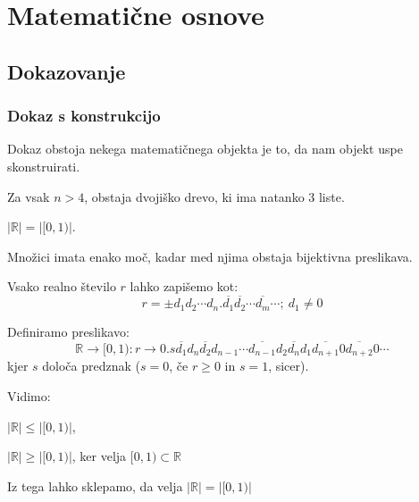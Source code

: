 \documentclass[10pt,a4paper,oneside]{book}
\begin{document}
\section{Matematične osnove}
\subsection{Dokazovanje}
\subsubsection{Dokaz s konstrukcijo}
Dokaz obstoja nekega matematičnega objekta je to, da nam objekt uspe skonstruirati.

\begin{primeri}
\item Za vsak $n>4$, obstaja dvojiško drevo, ki ima natanko $3$ liste.
\item $| \mathbb{R} | = | [0,1) |$.\\
	\begin{items}
	\item Množici imata enako moč, kadar med njima obstaja bijektivna preslikava.
	\item Vsako realno število $r$ lahko zapišemo kot:
	\begin{displaymath}
		r=\pm d_1 d_2 \cdots d_n . \overline{d_1}\overline{d_2} \cdots \overline{d_m} \cdots;\ d_1 \neq 0
	\end{displaymath}
	\item Definiramo preslikavo:
	\begin{displaymath}
		\mathbb{R}\rightarrow [0,1): r \rightarrow 0.s\overline{d_1} d_{n} \overline{d_2} d_{n-1} \cdots \overline{d_{n-1}} d_2 \overline{d_n} d_1 \overline{d_{n+1}} 0\overline{d_{n+2}} 0 \cdots
	\end{displaymath}
	kjer $s$ določa predznak ($s=0$, če $r \ge 0$ in $s=1$, sicer).
	\item Vidimo:
		\begin{items}
		\item $|\mathbb{R}|\le |[0,1)|$, %
		\item $|\mathbb{R}|\ge |[0,1)|$, ker velja $[0,1) \subset \mathbb{R}$
		\end{items}
	\item Iz tega lahko sklepamo, da velja $|\mathbb{R}|=|[0,1)|$
	\end{items}
\end{primeri}
	
\end{document}
